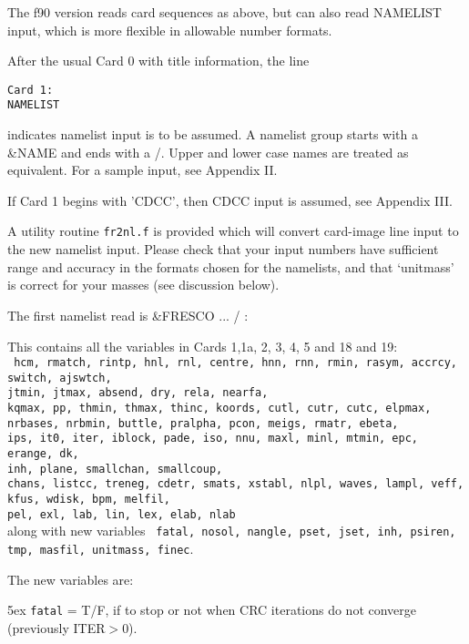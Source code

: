\documentclass[11pt]{article}
\begin{document}
\bigskip
The f90 version reads card sequences as above, but can also read NAMELIST
input, which is more flexible in allowable number formats.

After the usual Card 0 with title information, the line
\begin{verbatim}
Card 1:
NAMELIST
\end{verbatim}
indicates namelist input is to be assumed.
A namelist group starts with a \&NAME and ends with a /. Upper and lower
case names are treated as equivalent. For a sample input, see Appendix II.

If Card 1 begins with 'CDCC', then CDCC input is assumed, see Appendix III.

\bigskip
A utility routine {\tt fr2nl.f} is provided which will convert card-image
line input to the new namelist input.
Please check that your input numbers have sufficient
range and accuracy in the formats chosen for the namelists,
and that `unitmass' is correct for your masses (see discussion  below).

\bigskip
The first namelist read is \&FRESCO ... / :


This contains all the variables in Cards 1,1a, 2, 3, 4, 5 and  18 and 19:\\
{\tt
hcm, rmatch, rintp, hnl, rnl, centre, hnn, rnn, rmin,
    rasym, accrcy, switch, ajswtch,  \\
jtmin, jtmax, absend, dry, rela, nearfa, \\
kqmax, pp, thmin, thmax, thinc, koords, cutl, cutr, cutc, elpmax,\\
nrbases, nrbmin, buttle, pralpha, pcon, meigs, rmatr, ebeta, \\
ips, it0, iter, iblock, pade, iso, nnu, maxl, minl, mtmin, epc, erange, dk, \\
inh, plane, smallchan, smallcoup, \\
chans, listcc, treneg, cdetr, smats, xstabl, nlpl, waves,
   lampl, veff, kfus, wdisk, bpm, melfil, \\
pel, exl, lab, lin, lex, elab, nlab
}\\
along with new variables {\tt
fatal, nosol, nangle, pset, jset, inh, psiren, tmp, masfil, unitmass, finec}.

The new variables are:


\hangindent 5ex
{\tt fatal} = T/F, if to stop or not when CRC iterations do not converge
        (previously ITER$>$0).
\end{document}
